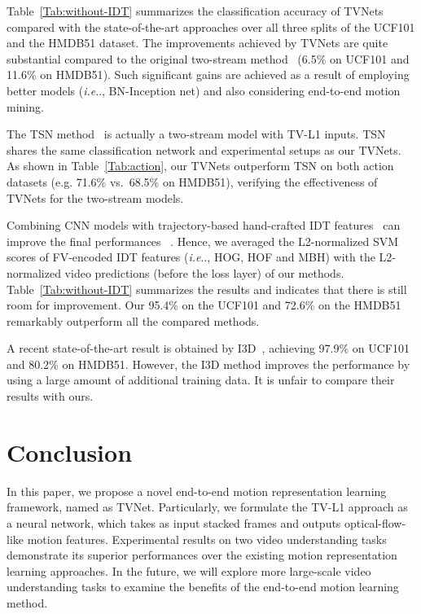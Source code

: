 \documentclass[10pt,twocolumn,letterpaper]{article}
\makeatletter
\DeclareRobustCommand\onedot{\futurelet\@let@token\@onedot}
\def\@onedot{\ifx\@let@token.\else.\null\fi\xspace}
\def\ie{\emph{i.e}\onedot} \def\Ie{\emph{I.e}\onedot}
\makeatother
\begin{document}
Table~\ref{Tab:without-IDT} summarizes the classification accuracy of TVNets compared with the state-of-the-art approaches over all three splits of the {UCF101} and the {HMDB51} dataset.
The improvements achieved by TVNets are quite substantial compared to the original two-stream method~\cite{Simonyan_NIPS14} (6.5\% on {UCF101} and 11.6\% on  {HMDB51}). Such significant gains are achieved as a result of employing better models (\ie, BN-Inception net)
and also considering end-to-end motion mining.

The TSN method~\cite{Wang_ECCV16} is actually a two-stream model with TV-L1 inputs.
TSN shares the same classification network and experimental setups as our TVNets.
As shown in Table~\ref{Tab:action}, our TVNets outperform TSN on both action datasets (e.g. 71.6\% vs.\ 68.5\% on HMDB51), verifying the effectiveness of TVNets for the two-stream models.


Combining CNN models with trajectory-based hand-crafted IDT features~\cite{wang2013action} can improve the final performances ~\cite{wang2015action,tran2015learning,bilen2016dynamic,Feichtenhofer_NIPS16}. Hence, we averaged the L2-normalized SVM scores of FV-encoded IDT features (\ie, HOG, HOF and MBH) with the L2-normalized video predictions (before the loss layer) of our methods. Table~\ref{Tab:without-IDT} summarizes the results and indicates that there is still room for improvement. Our 95.4\% on the {UCF101} and 72.6\% on the {HMDB51} remarkably outperform all the compared methods.

A recent state-of-the-art result is obtained by I3D~\cite{carreira2017quo}, achieving 97.9\% on {UCF101} and 80.2\% on {HMDB51}. However, the I3D method improves the performance by using a large amount of additional training data. It is unfair to compare their results with ours.







 

\section{Conclusion}
In this paper, we propose a novel end-to-end motion representation learning framework, named as TVNet. Particularly, we formulate the TV-L1 approach as a neural network, which takes as input stacked frames and outputs optical-flow-like motion features. Experimental results on two video understanding tasks demonstrate its superior performances over the existing motion representation learning approaches. In the future, we will explore more large-scale video understanding tasks to examine the benefits of the end-to-end motion learning method. 




{\small


}
\end{document}
